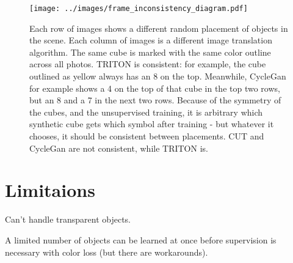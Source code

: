 \documentclass{article}
\begin{document}




\label{sec:results}

\begin{figure}[H]
	\begin{center}
		\texttt{[image: ../images/frame\_inconsistency\_diagram.pdf]}
	\end{center}

	
	\caption{
		Each row of images shows a different random placement of objects in the scene.
		Each column of images is a different image translation algorithm.
		The same cube is marked with the same color outline across all photos.
		TRITON is consistent: for example, the cube outlined as yellow always has an 8 on the top.
		Meanwhile, CycleGan for example shows a 4 on the top of that cube in the top two rows, but an 8 and a 7 in the next two rows.
		Because of the symmetry of the cubes, and the unsupervised training, it is arbitrary which synthetic cube gets which symbol after training - but whatever it chooses, it should be consistent between placements.
		CUT and CycleGan are not consistent, while TRITON is.
		}
	\label{fig:frame_inconsistency_diagram}
\end{figure}


\section{Limitaions}
\label{sec:Limitations} 

Can't handle transparent objects. 

A limited number of objects can be learned at once before supervision is necessary with color loss (but there are workarounds).
\end{document}
